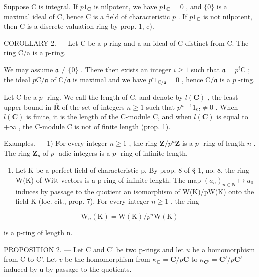 Suppose C is integral. If \(p1_{\mathbf{C}}\) is nilpotent, we have \(p1_{\mathbf{C}} = 0\) , and \(\{0\}\) is a maximal ideal of C, hence C is a field of characteristic \(p\) . If \(p1_{\mathbf{C}}\) is not nilpotent, then C is a discrete valuation ring by prop. 1, c).

COROLLARY 2. --- Let C be a p-ring and a an ideal of C distinct from C. The ring C/a is a p-ring.

We may assume \(\mathfrak{a} \neq \{0\}\) . There then exists an integer \(i \geqslant 1\) such that \(\mathfrak{a} = p^i\mathrm{C}\) ; the ideal \(p\mathrm{C} / \mathfrak{a}\) of \(\mathrm{C} / \mathfrak{a}\) is maximal and we have \(p^i1_{\mathrm{C} / \mathfrak{a}} = 0\) , hence \(\mathrm{C} / \mathfrak{a}\) is a \(p\) -ring.

Let C be a \(p\) -ring. We call the length of C, and denote by \(l(\mathbf{C})\) , the least upper bound in \(\overline{\mathbf{R}}\) of the set of integers \(n \geqslant 1\) such that \(p^{n-1}1_{\mathbf{C}} \neq 0\) . When \(l(\mathbf{C})\) is finite, it is the length of the C-module C, and when \(l(\mathbf{C})\) is equal to \(+\infty\) , the C-module C is not of finite length (prop. 1).

Examples. --- 1) For every integer \(n \geqslant 1\) , the ring \(\mathbf{Z}/p^{n}\mathbf{Z}\) is a \(p\) -ring of length \(n\) . The ring \(\mathbf{Z}_{p}\) of \(p\) -adic integers is a \(p\) -ring of infinite length.

\begin{enumerate}
\def\labelenumi{\arabic{enumi})}
\setcounter{enumi}{1}
\tightlist
\item
  Let K be a perfect field of characteristic p. By prop. 8 of § 1, no. 8, the ring W(K) of Witt vectors is a p-ring of infinite length. The map \((a_{n})_{n\in\mathbf{N}} \mapsto a_{0}\) induces by passage to the quotient an isomorphism of W(K)/pW(K) onto the field K (loc. cit., prop. 7). For every integer \(n \geqslant 1\) , the ring
\end{enumerate}

\[
\mathrm{W} _ {n} (\mathrm{K}) = \mathrm{W} (\mathrm{K}) / p ^ {n} \mathrm{W} (\mathrm{K})
\]

is a p-ring of length n.

PROPOSITION 2. --- Let C and C' be two p-rings and let \(u\) be a homomorphism from C to C'. Let \(v\) be the homomorphism from \(\kappa_{\mathbf{C}} = \mathbf{C} / p\mathbf{C}\) to \(\kappa_{\mathbf{C}'} = \mathbf{C}' / p\mathbf{C}'\) induced by u by passage to the quotients.

